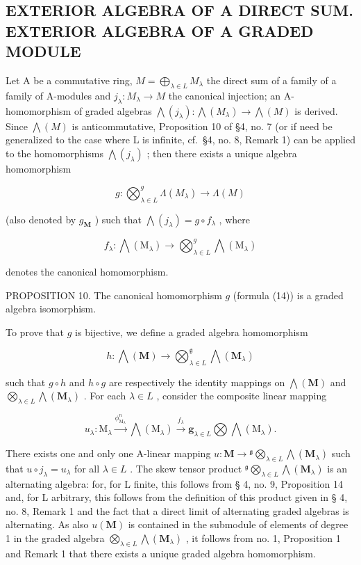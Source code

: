 \subsection{EXTERIOR ALGEBRA OF A DIRECT SUM. EXTERIOR ALGEBRA OF A GRADED MODULE}

Let A be a commutative ring, \(M = \bigoplus_{\lambda \in L} M_{\lambda}\) the direct sum of a family of a family of A-modules and \(j_{\lambda}: M_{\lambda} \to M\) the canonical injection; an A-homomorphism of graded algebras \(\bigwedge(j_{\lambda}): \bigwedge(M_{\lambda}) \to \bigwedge(M)\) is derived. Since \(\bigwedge(M)\) is anticommutative, Proposition 10 of §4, no. 7 (or if need be generalized to the case where L is infinite, cf.~§4, no. 8, Remark 1) can be applied to the homomorphisms \(\bigwedge(j_{\lambda})\) ; then there exists a unique algebra homomorphism

\[
g \colon \bigotimes_ {\lambda \in L} ^ {g} \Lambda (M _ {\lambda}) \to \Lambda (M)\tag{14}
\]

(also denoted by \(g_{\mathbf{M}}\) ) such that \(\bigwedge (j_{\lambda}) = g \circ f_{\lambda}\) , where

\[
f _ {\lambda}: \bigwedge (\mathrm{M} _ {\lambda}) \rightarrow \bigotimes_ {\lambda \in L} ^ {g} \bigwedge (\mathrm{M} _ {\lambda})
\]

denotes the canonical homomorphism.

PROPOSITION 10. The canonical homomorphism \(g\) (formula (14)) is a graded algebra isomorphism.

To prove that \(g\) is bijective, we define a graded algebra homomorphism

\[
h: \bigwedge (\mathbf {M}) \rightarrow \bigotimes_ {\lambda \in L} ^ {\mathfrak {g}} \bigwedge (\mathbf {M} _ {\lambda})\tag{15}
\]

such that \(g \circ h\) and \(h \circ g\) are respectively the identity mappings on \(\bigwedge(\mathbf{M})\) and \(\bigotimes_{\lambda \in L} \bigwedge(\mathbf{M}_{\lambda})\) . For each \(\lambda \in L\) , consider the composite linear mapping

\[
u _ {\lambda}: \mathrm{M} _ {\lambda} \xrightarrow {\phi_ {\mathrm{M} _ {\lambda}} ^ {n}} \bigwedge (\mathrm{M} _ {\lambda}) \xrightarrow {f _ {\lambda}} \mathbf {g} _ {\lambda \in L} \bigotimes \bigwedge (\mathrm{M} _ {\lambda}).
\]

There exists one and only one A-linear mapping \(u: \mathbf{M} \to {}^{\mathfrak{g}} \bigotimes_{\lambda \in L} \bigwedge (\mathbf{M}_{\lambda})\) such that \(u \circ j_{\lambda} = u_{\lambda}\) for all \(\lambda \in L\) . The skew tensor product \({}^{\mathfrak{g}} \bigotimes_{\lambda \in L} \bigwedge (\mathbf{M}_{\lambda})\) is an alternating algebra: for, for L finite, this follows from § 4, no. 9, Proposition 14 and, for L arbitrary, this follows from the definition of this product given in § 4, no. 8, Remark 1 and the fact that a direct limit of alternating graded algebras is alternating. As also \(u(\mathbf{M})\) is contained in the submodule of elements of degree 1 in the graded algebra \(\bigotimes_{\lambda \in L} \bigwedge (\mathbf{M}_{\lambda})\) , it follows from no. 1, Proposition 1 and Remark 1 that there exists a unique graded algebra homomorphism.

